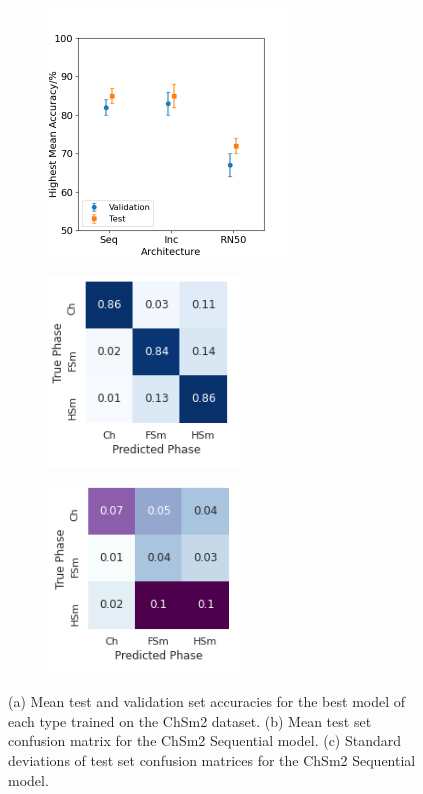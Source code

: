 \documentclass[12pt]{article}
\begin{document}
\begin{figure}[!h]
\centering
\begin{subfigure}{0.37\textwidth}
	\centering
	\includegraphics[width=2.5in]{images/Graphs/ChSm2.png}
	\caption{}
	\label{chsm2:graph}
\end{subfigure}%
\begin{subfigure}{0.3\textwidth}
	\centering
	\includegraphics[width=2in]{images/ConMats/ChSm2_mean.png}
	\caption{}
	\label{chsm2:mean}
\end{subfigure}%
\begin{subfigure}{0.3\textwidth}
	\centering
	\includegraphics[width=2in]{images/ConMats/ChSm2_std.png}
	\caption{}
	\label{chsm2:std}
\end{subfigure}%
\caption{(a) Mean test and validation set accuracies for the best model of each type trained on the ChSm2 dataset. (b) Mean test set confusion matrix for the ChSm2 Sequential model. (c) Standard deviations of test set confusion matrices for the ChSm2 Sequential model.}
\label{chsm2:chsm2}
\end{figure}
\end{document}
